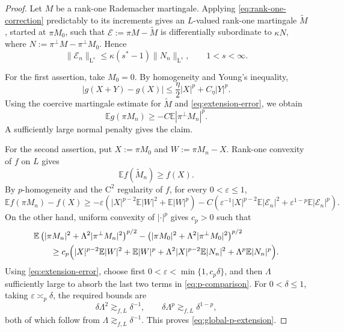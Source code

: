 \documentclass[10pt,a4paper]{amsart}
\newcommand{\LL}{\mathrm{L}}
\begin{document}
\begin{proof}
Let $M$ be a rank-one Rademacher martingale. Applying
\eqref{eq:rank-one-correction} predictably to its increments gives
an $L$-valued rank-one martingale $\widetilde M$, started at
$\pi M_0$, such that
$
\mathcal E\mathrel{:=}\pi M-\widetilde M
$
is differentially subordinate to
$\kappa N$,
where $
N\mathrel{:=}\pi^\perp M-\pi^\perp M_0$.
Hence
\begin{equation}
\label{eq:extension-error}
\|\mathcal E_n\|_{\LL^s}
\le
\kappa(s^*-1)\|N_n\|_{\LL^s},
\qquad 1<s<\infty.
\end{equation}

For the first assertion, take $M_0=0$. By homogeneity and Young's
inequality,
\[
|g(X+Y)-g(X)|
\le
\frac{\eta}{2}|X|^p+C_\eta|Y|^p.
\]
Using the coercive martingale estimate for $\widetilde M$ and
\eqref{eq:extension-error}, we obtain
\[
\mathbb E g(\pi M_n)
\ge
-C\mathbb E|\pi^\perp M_n|^p.
\]
A sufficiently large normal penalty gives the claim.

For the second assertion, put
$X\mathrel{:=}\pi M_0$ and 
$W\mathrel{:=}\pi M_n-X$. 
Rank-one convexity of $f$ on $L$ gives
\[
\mathbb E f(\widetilde M_n)\ge f(X).
\]
By $p$-homogeneity and the $\mathrm{C}^2$ regularity of $f$, for every
$0<\varepsilon\le 1$,
\begin{equation}
\mathbb E f(\pi M_n)-f(X)
\ge
-\varepsilon
\left(
|X|^{p-2}\mathbb E|W|^2+\mathbb E|W|^p
\right)
-
C
\left(
\varepsilon^{-1}|X|^{p-2}\mathbb E|\mathcal E_n|^2+
\varepsilon^{1-p}\mathbb E|\mathcal E_n|^p
\right).
\label{eq:p-comparison}
\end{equation}
On the other hand, uniform convexity of $|\cdot|^p$ gives
$c_p>0$ such that
\begin{align}
&\mathbb E
\left(
|\pi M_n|^2+\Lambda^2|\pi^\perp M_n|^2
\right)^{p/2}
-
\left(
|\pi M_0|^2+\Lambda^2|\pi^\perp M_0|^2
\right)^{p/2}
\nonumber\\
&\qquad\ge
c_p\Bigl(
|X|^{p-2}\mathbb E|W|^2+\mathbb E|W|^p
+
\Lambda^2|X|^{p-2}\mathbb E|N_n|^2
+
\Lambda^p\mathbb E|N_n|^p
\Bigr).
\label{eq:p-penalty-gain}
\end{align}
Using \eqref{eq:extension-error}, choose first
$0<\varepsilon<\min\{1,c_p\delta\}$, and then $\Lambda$
sufficiently large to absorb the last two terms in
\eqref{eq:p-comparison}. For $0<\delta\le1$, taking
$\varepsilon\asymp_p\delta$, the required bounds are
\[
\delta\Lambda^2\gtrsim_{f,L}\delta^{-1},
\qquad
\delta\Lambda^p\gtrsim_{f,L}\delta^{1-p},
\]
both of which follow from
$\Lambda\gtrsim_{f,L}\delta^{-1}$.
This proves \eqref{eq:global-p-extension}.
\end{proof}
\end{document}
